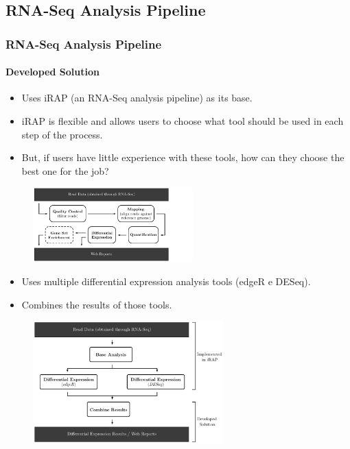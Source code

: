 \documentclass[xcolor=dvipsnames]{beamer}
\begin{document}
\subsection{RNA-Seq Analysis Pipeline}
\begin{frame}[allowframebreaks]
  \frametitle{RNA-Seq Analysis Pipeline}
  \framesubtitle{Developed Solution}

\begin{itemize}
\item
Uses iRAP (an RNA-Seq analysis pipeline) as its base.

\item
iRAP is flexible and allows users to choose what tool should be used in each
step of the process.

\item
But, if users have little experience with these tools, how can they choose the
best one for the job?
\end{itemize}

\begin{figure}
  \centering
  \includegraphics[width=0.55\textwidth]{irap}
\end{figure}

\framebreak

\begin{itemize}\small
\item
Uses multiple differential expression analysis tools (edgeR e DESeq).

\item
Combines the results of those tools.
\end{itemize}

\begin{figure}
  \centering
  \includegraphics[width=0.65\textwidth]{tool1}
\end{figure}


\end{frame}
\end{document}
